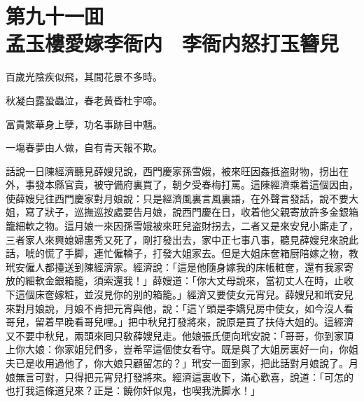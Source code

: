 
\chapter*{第九十一囬　\\孟玉樓愛嫁李衙内　李衙内怒打玉簪兒}


\begin{myquote}
百歲光陰疾似飛，其間花景不多時。

秋凝白露蛩蟲泣，春老黄昏杜宇啼。

富貴繁華身上孽，功名事跡目中魑。

一塲春夢由人做，自有青天報不欺。
\end{myquote}

話說一日陳經濟聽見薛嫂兒說，西門慶家孫雪娥，被來旺因姦抵盗財物，拐出在外，事發本縣官賣，被守備府裏買了，朝夕受春梅打罵。這陳經濟乘着這個因由，使薛嫂兒往西門慶家對月娘說：只是經濟風裏言風裏語，在外聲言發話，說不要大姐，寫了狀子，巡撫巡按處要告月娘，說西門慶在日，收着他父親寄放許多金銀箱籠細軟之物。這月娘一來因孫雪娥被來旺兒盗財拐去，二者又是來安兒小廝走了，三者家人來興媳婦惠秀又死了，剛打發出去，家中正七事八事，聽見薛嫂兒來說此話，唬的慌了手脚，連忙僱轎子，打發大姐家去。但是大姐床奩箱厨陪嫁之物，教玳安僱人都擡送到陳經濟家。經濟說：「這是他隨身嫁我的床帳粧奩，還有我家寄放的細軟金銀箱籠，須索還我！」薛嫂道：「你大丈母說來，當初丈人在時，止收下這個床奩嫁粧，並沒見你的别的箱籠。」經濟又要使女元宵兒。薛嫂兒和玳安兒來對月娘說，月娘不肯把元宵與他，說：「這丫頭是李嬌兒房中使女，如今沒人看哥兒，留着早晚看哥兒哩。」把中秋兒打發將來，說原是買了扶侍大姐的。這經濟又不要中秋兒，兩頭來囘只敎薛嫂兒走。他娘張氏便向玳安說：「哥哥，你到家頂上你大娘：你家姐兒們多，豈希罕這個使女看守。既是與了大姐房裏好一向，你姐夫已是收用過他了，你大娘只顧留怎的？」玳安一面到家，把此話對月娘說了。月娘無言可對，只得把元宵兒打發將來。經濟這裏收下，滿心歡喜，說道：「可怎的也打我這條道兒來？正是：饒你奸似鬼，也喫我洗脚水！」

